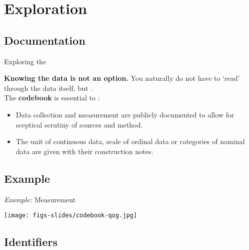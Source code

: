 \documentclass{beamer}
\begin{document}
	\section{Exploration}
	
	\subsection{Documentation}

	\begin{frame}[t]{Exploring the }
		
	\textbf{Knowing the data is not an option.} You naturally do not have to `read' through the data itself, but .\\[1em]
	
	The \textbf{codebook} is essential to :		
		\begin{itemize}
			\item Data collection and measurement are publicly documented to allow for sceptical scrutiny of sources and method.
			\item The unit of continuous data, scale of ordinal data or categories of nominal data are given with their construction notes.
		\end{itemize}
	
	\end{frame}
	
	\subsection{Example}
	
	\begin{frame}[t]{\textit{Example:} Measurement}
		\begin{center}
			\texttt{[image: figs-slides/codebook-qog.jpg]}		
		\end{center}
	\end{frame}

	
	\subsection{Identifiers}
\end{document}
